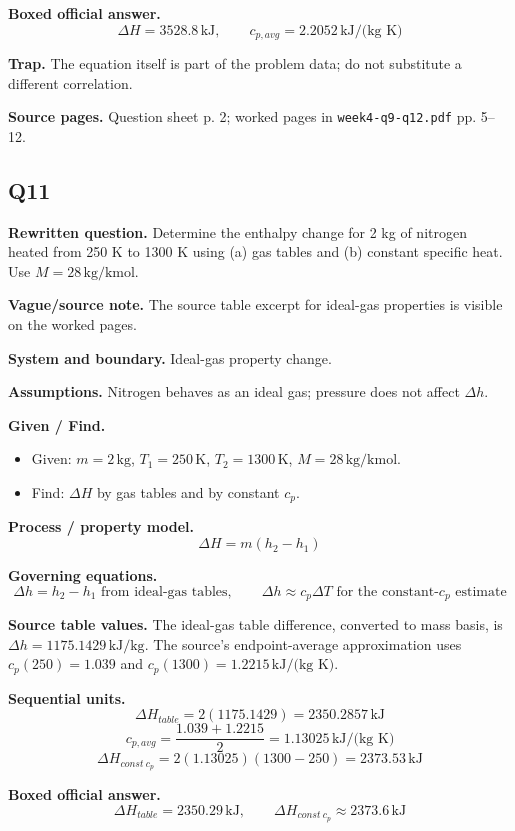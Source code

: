 \textbf{Boxed official answer.}
\[\boxed{\Delta H=3528.8\,\text{kJ},\qquad c_{p,avg}=2.2052\,\text{kJ/(kg K)}}\]

\textbf{Trap.} The equation itself is part of the problem data; do not substitute a different correlation.

\textbf{Source pages.} Question sheet p. 2; worked pages in \texttt{week4-q9-q12.pdf} pp. 5--12.

\subsection*{Q11}
\textbf{Rewritten question.} Determine the enthalpy change for 2 kg of nitrogen heated from 250 K to 1300 K using (a) gas tables and (b) constant specific heat. Use $M=28\,\text{kg/kmol}$.

\textbf{Vague/source note.} The source table excerpt for ideal-gas properties is visible on the worked pages.

\textbf{System and boundary.} Ideal-gas property change.

\textbf{Assumptions.} Nitrogen behaves as an ideal gas; pressure does not affect $\Delta h$.

\textbf{Given / Find.}
\begin{itemize}
  \item Given: $m=2\,\text{kg}$, $T_1=250\,\text{K}$, $T_2=1300\,\text{K}$, $M=28\,\text{kg/kmol}$.
  \item Find: $\Delta H$ by gas tables and by constant $c_p$.
\end{itemize}

\textbf{Process / property model.}
\[
\Delta H=m(h_2-h_1)
\]

\textbf{Governing equations.}
\[
\Delta h = h_2-h_1\text{ from ideal-gas tables},\qquad \Delta h\approx c_p\Delta T\text{ for the constant-}c_p\text{ estimate}
\]

\textbf{Source table values.} The ideal-gas table difference, converted to mass basis, is $\Delta h=1175.1429\,\text{kJ/kg}$. The source's endpoint-average approximation uses $c_p(250)=1.039$ and $c_p(1300)=1.2215\,\text{kJ/(kg K)}$.

\textbf{Sequential units.}
\[
 \Delta H_{table}=2(1175.1429)=2350.2857\,\text{kJ}
\]
\[
 c_{p,avg}=\frac{1.039+1.2215}{2}=1.13025\,\text{kJ/(kg K)}
\]
\[
 \Delta H_{const\ c_p}=2(1.13025)(1300-250)=2373.53\,\text{kJ}
\]

\textbf{Boxed official answer.}
\[\boxed{\Delta H_{table}=2350.29\,\text{kJ},\qquad \Delta H_{const\ c_p}\approx2373.6\,\text{kJ}}\]

